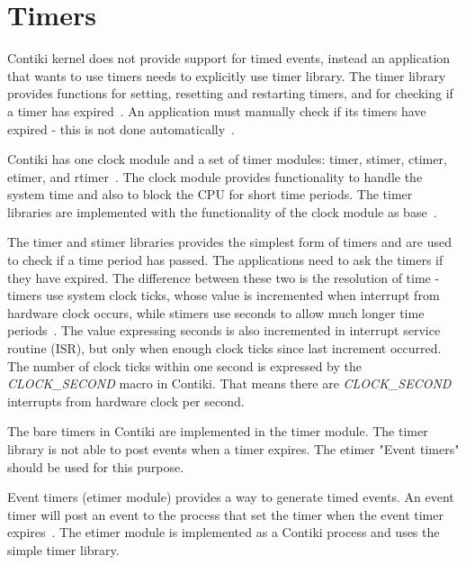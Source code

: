 
\section{Timers}\label{sec:contiki-timers}
Contiki kernel does not provide support for timed events,
instead an application that wants to use timers needs to explicitly use timer library.
The timer library provides functions for setting, resetting and restarting timers,
and for checking if a timer has expired~\cite{contiki-docs}.
An application must manually check if its timers have expired - this is not done automatically~\cite{contiki-docs}.

Contiki has one clock module and a set of timer modules: timer, stimer, ctimer, etimer, and rtimer~\cite{contiki-wiki-timers}.
The clock module provides functionality to handle the system time and also to block the CPU for short time periods.
The timer libraries are implemented with the functionality of the clock module as base~\cite{contiki-wiki-timers}.

The timer and stimer libraries provides the simplest form of timers and are used to check if a time period has passed.
The applications need to ask the timers if they have expired.
The difference between these two is the resolution of time -
timers use system clock ticks, whose value is incremented when interrupt from hardware clock occurs,
while stimers use seconds to allow much longer time periods~\cite{contiki-wiki-timers}.
The value expressing seconds is also incremented in interrupt service routine (ISR),
but only when enough clock ticks since last increment occurred.
The number of clock ticks within one second is expressed by the {\it{CLOCK\_SECOND}} macro in Contiki.
That means there are {\it{CLOCK\_SECOND}} interrupts from hardware clock per second.

The bare timers in Contiki are implemented in the timer module.
The timer library is not able to post events when a timer
expires. The etimer "Event timers" should be used for this
purpose.


Event timers (etimer module) provides a way to generate timed events.
An event timer will post an event to the process that set the timer when the
event timer expires~\cite{contiki-docs}.
The etimer module is implemented as a Contiki process and uses the simple timer library.

